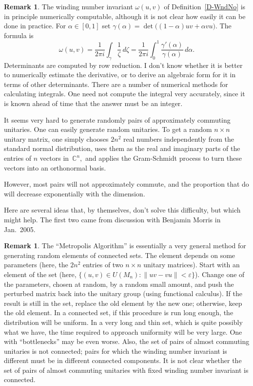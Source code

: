 \documentclass[10pt]{amsart}
\theoremstyle{definition}
\newtheorem{rmk}[thm]{Remark}
\newcommand{\af}{\alpha}
\newcommand{\gm}{\gamma}
\newcommand{\ep}{\varepsilon}
\newcommand{\zt}{\zeta}
\newcommand{\om}{\omega}
\newcommand{\C}{{\mathbb{C}}}
\begin{document}
\begin{rmk}\label{R-NumW}
The winding number invariant $\om (u, v)$ of Definition~\ref{D-WndNo}
is in principle numerically computable,
although it is not clear how easily it can be done in practice.
For $\af \in [0, 1]$
set $\gm (\af) = \det \big( (1 - \af) u v + \af v u \big).$
The formula is
\[
\om (u, v)
  = \frac{1}{2 \pi i} \int_{\gm} \frac{1}{\zt} \, d \zt
  = \frac{1}{2 \pi i} \int_0^1 \frac{\gm' (\af)}{\gm (\af)} \, d \af.
\]
Determinants are computed by row reduction.
I don't know whether it is better to numerically estimate
the derivative,
or to derive an algebraic form for it in terms of other
determinants.
There are a number of numerical methods for calculating integrals.
One need not compute the integral very accurately,
since it is known ahead of time that the answer must be an integer.
\end{rmk}

It seems very hard to generate randomly pairs of approximately
commuting unitaries.
One can easily generate random unitaries.
To get a random $n \times n$ unitary matrix,
one simply chooses $2 n^2$ real numbers independently
from the standard normal distribution,
uses them as the real and imaginary parts of the entries
of $n$ vectors in~$\C^n,$
and applies the Gram-Schmidt process to turn these vectors
into an orthonormal basis.

However, most pairs will
not approximately commute,
and the proportion that do
will decrease exponentially with the dimension.

Here are several ideas that, by themselves, don't solve this difficulty,
but which might help.
The first two
came from discussion with Benjamin Morris in Jan.\  2005.

\begin{rmk}\label{R-Metropolis}
The ``Metropolis Algorithm'' is essentially a very general method
for generating random elements of connected sets.
The element depends on some parameters
(here, the $2 n^2$ entries of two $n \times n$ unitary matrices).
Start with an element of the set
(here,
$\{ (u, v) \in U (M_n) \colon \| u v - v u \| < \ep \}$).
Change one of the parameters, chosen at random,
by a random small amount, and push the perturbed matrix back into the
unitary group (using functional calculus).
If the result is still in the set,
replace the old element by the new one;
otherwise, keep the old element.
In a connected set, if this procedure is run long enough,
the distribution will be uniform.
In a very long and thin set,
which is quite possibly what we have,
the time required to approach uniformity will be very large.
One with ``bottlenecks'' may be even worse.
Also, the set of pairs of almost commuting unitaries is not connected;
pairs for which the winding number invariant is different must
be in different connected components.
It is not clear whether the set of pairs of almost commuting unitaries
with fixed winding number invariant is connected.
\end{rmk}
\end{document}
